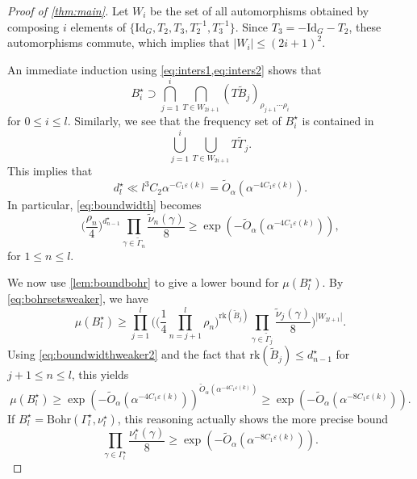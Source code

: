 \documentclass{daj}
\theoremstyle{definition}
\newcommand{\eps}{\varepsilon}
\begin{document}
\begin{proof}[Proof of \cref{thm:main}]
Let $W_i$ be the set of all automorphisms obtained by composing $i$ elements of $\{\mathrm{Id}_{G}, T_2, T_3, T_2^{-1}, T_3^{-1}\}$. Since $T_3 = -\mathrm{Id}_{G} - T_2$, these automorphisms commute, which implies that $|W_i| \leq (2i+1)^2$.

An immediate induction using \cref{eq:inters1,eq:inters2} shows that 
\begin{equation}
\label{eq:bohrsetsweaker}
B_i^{\star} \supset  \bigcap_{j=1}^{i} \bigcap_{T\in W_{2i+1}} (T \widetilde{B}_j)_{\rho_{j+1}\cdots \rho_i}
\end{equation}
for $0\leq i\leq l$. Similarly, we see that the frequency set of $B_i^{\star}$ is contained in 
\begin{equation*}
 \bigcup_{j=1}^{i} \bigcup_{T\in W_{2i+1}} T \widetilde{\Gamma}_j.
\end{equation*}
This implies that
\begin{equation*}
d_{l}^{\star} \ll l^3 C_2\alpha^{-C_1\eps(k)} = \tilde{O}_{\alpha}\left(\alpha^{-4C_1\eps(k)}\right).
\end{equation*}
In particular, \cref{eq:boundwidth} becomes
\begin{equation}
\label{eq:boundwidthweaker2}
	\bigg(\frac{\rho_n}{4}\bigg)^{d_{n-1}^{\star}}\prod_{\gamma \in \widetilde{\Gamma}_n} \frac{\widetilde{\nu}_n(\gamma)}{8} \geq   \exp \left( - \tilde{O}_{\alpha}\left(\alpha^{-4C_1\eps(k)}\right) \right),
\end{equation}
for $1\leq n \leq l$. 

We now use \cref{lem:boundbohr} to give a lower bound for $\mu(B_l^{\star})$. By \cref{eq:bohrsetsweaker}, we have 
\begin{equation*}
\mu(B_l^{\star}) \geq \prod_{j=1}^{l}\Bigg( \bigg(\frac{1}{4}\prod_{n=j+1}^{l} \rho_n\bigg)^{\mathrm{rk}(\widetilde{B}_j)}\prod_{\gamma\in \widetilde{\Gamma}_j} \frac{\widetilde{\nu}_j(\gamma)}{8}\Bigg)^{|W_{2l+1}|}.
\end{equation*}
Using \cref{eq:boundwidthweaker2} and the fact that $\mathrm{rk}(\widetilde{B}_j) \leq d_{n-1}^{\star}$ for  $j+1\leq n\leq l$, this yields
\begin{equation}
\label{eq:sizelastBohrset}
\mu(B_l^{\star}) \geq  \exp \left( - \tilde{O}_{\alpha}\left(\alpha^{-4C_1\eps(k)}\right) \right)^{ \tilde{O}_{\alpha}\left(\alpha^{-4C_1\eps(k)} \right)} \geq  \exp \left( - \tilde{O}_{\alpha}\left(\alpha^{-8C_1\eps(k)}\right) \right).
\end{equation}
If $B_l^{\star} = \mathrm{Bohr}(\Gamma_l^{\star}, \nu_l^{\star})$, this reasoning actually shows the more precise bound
\begin{equation}
\label{eq:sizelastBohrset2}
\prod_{\gamma\in \Gamma_l^{\star}} \frac{\nu_l^{\star}(\gamma)}{8} \geq \exp \left( - \tilde{O}_{\alpha}\left(\alpha^{-8C_1\eps(k)}\right) \right).
\end{equation}



\end{proof}
\end{document}
